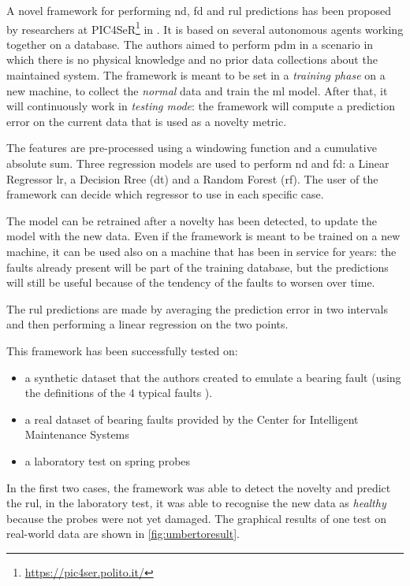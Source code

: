 A novel framework for performing \gls{nd}, \gls{fd} and \gls{rul} predictions has been proposed by researchers at PIC4SeR\footnote{\url{https://pic4ser.polito.it/}} in \cite{Umberto}. It is based on several autonomous agents working together on a database.  The authors aimed to perform \gls{pdm} in a scenario in which there is no physical knowledge and no prior data collections about the maintained system. The framework is meant to be set in a \emph{training phase} on a new machine, to collect the \emph{normal} data and train the \gls{ml} model. After that, it will continuously work in \emph{testing mode}: the framework will compute a prediction error on the current data that is used as a novelty metric.

The features are pre-processed using a windowing function and a cumulative absolute sum. Three regression models are used to perform \gls{nd} and \gls{fd}: a Linear Regressor \gls{lr}, a Decision Rree (\gls{dt}) and a Random Forest (\gls{rf}). The user of the framework can decide which regressor to use in each specific case. 

The model can be retrained after a novelty has been detected, to update the model with the new data. Even if the framework is meant to be trained on a new machine, it can be used also on a machine that has been in service for years: the faults already present will be part of the training database, but the predictions will still be useful because of the tendency of the faults to worsen over time.

The \gls{rul} predictions are made by averaging the prediction error in two intervals and then performing a linear regression on the two points. 

This framework has been successfully tested on:  
\begin{itemize}
    \item a synthetic dataset that the authors created to emulate a bearing fault (using the definitions of the 4 typical faults \cite{RollingSignature}).
    \item a real dataset of bearing faults provided by the Center for Intelligent Maintenance Systems \cite{IMSpaper}
    \item a laboratory test on spring probes
\end{itemize}

In the first two cases, the framework was able to detect the novelty and predict the \gls{rul}, in the laboratory test, it was able to recognise the new data as \emph{healthy} because the probes were not yet damaged. The graphical results of one test on real-world data are shown in \autoref{fig:umbertoresult}.


